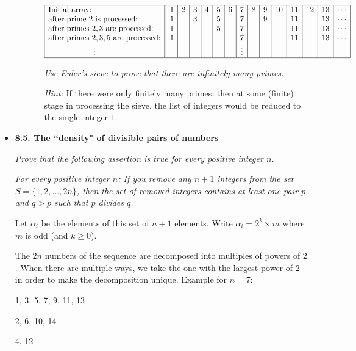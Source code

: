 \begin{itemize}
\begin{itemize}
\begin{enumerate}
\medskip

$\begin{array}{|l||c|c|c|c|c|c|c|c|c|c|c|c|c|c|}
\hline
\mbox{Initial array:} &
1 & 2 & 3 & 4 & 5 & 6 & 7 & 8 & 9 & 10 & 11 & 12 & 13 & \cdots \\
\mbox{after prime $2$ is processed:} &
1 &  & 3 &  & 5 &  & 7 &  & 9 &  & 11 &  & 13 & \cdots \\
\mbox{after primes $2, 3$ are processed:} &
1 &  &  &  & 5 &  & 7 &  &  &  & 11 &  & 13 & \cdots \\
\mbox{after primes $2, 3, 5$ are processed:} &
1 &  &  &  &  &  & 7 &  &  &  & 11 &  & 13 & \cdots \\
\hspace*{.8in} \vdots  &
 &  &  &  &  &  & \vdots &  &  &  &  &  &  & \\
\hline
\end{array}$

\bigskip

{\em Use Euler's sieve to prove that there are infinitely many primes.}
\medskip

{\em Hint:} If there were only finitely many primes, then at some (finite) stage in processing the sieve, the list of integers would be reduced to the single integer $1$.
\end{enumerate}
\end{itemize}

 \medskip\item

{\bf 8.5. The ``density"  of divisible pairs of numbers}

{\em Prove that the following assertion is true for every positive integer $n$.}
\medskip

{\em 
For every positive integer $n$:  If you remove {\em any} $n+1$ integers from the set $S = \{ 1, 2, \ldots, 2n\}$, then the set of removed integers contains at least one pair $p$ and $q > p$ such that $p$ divides $q$.
}
\medskip

Let $\alpha_i$ be the elements of this set of $n+1$ elements.
Write $\alpha_i = 2^k \times m$ where $m$ is odd (and $k \geq 0$).

The $2n$ numbers of the sequence are decomposed into multiples of powers of $2$.
When there are multiple ways, we take the one with the largest power of $2$ in order to make the decomposition unique.
Example for $n=7$:

1, 3, 5, 7, 9, 11, 13

2, 6, 10, 14

4, 12


\end{itemize}
